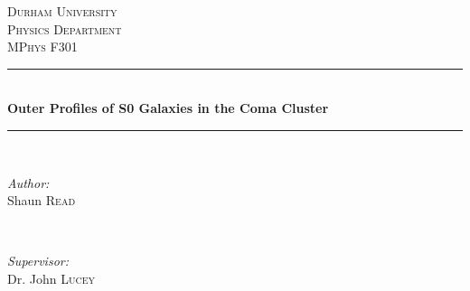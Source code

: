 \documentclass[12pt, preprint]{aastex}
\begin{document}
\begin{titlepage}

\newcommand{\HRule}{\rule{\linewidth}{0.5mm}} %

\center %
 

\textsc{\LARGE Durham University}\\[1cm] %
\textsc{\Large Physics Department}\\[0.5cm] %
\textsc{\large MPhys F301}\\[0.5cm] %


\HRule \\[0.4cm]
{ \huge \bfseries Outer Profiles of S0 Galaxies in the Coma Cluster}\\[0.4cm] %
\HRule \\[1.5cm]
 

\begin{minipage}{0.4\textwidth}
\begin{flushleft} \large
\emph{Author:}\\
Shaun \textsc{Read} %
\end{flushleft}
\end{minipage}
~
\begin{minipage}{0.4\textwidth}
\begin{flushright} \large
\emph{Supervisor:} \\
Dr. John \textsc{Lucey\\} %
\end{flushright}
\end{minipage}\\[1cm]




\end{titlepage}
\end{document}
